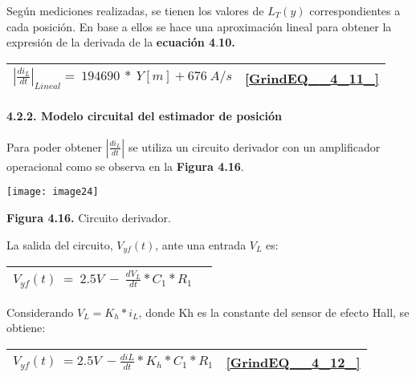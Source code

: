 \documentclass{article} %
\begin{document}
\noindent Seg\'{u}n mediciones realizadas, se tienen los valores de $L_T(y)$ correspondientes a cada posici\'{o}n. En base a ellos se hace una aproximaci\'{o}n lineal para obtener la expresi\'{o}n de la derivada de la \textbf{ecuaci\'{o}n 4}.\textbf{10.}

\noindent 

\begin{tabular}{|p{3.9in}|p{0.4in}|} \hline 
${\left|\frac{{di}_L}{dt}\right|}_{Lineal}=\ 194690\ *\ Y[m]+676\ A/s$ & \eqref{GrindEQ__4_11_}  \\ \hline 
\end{tabular}



\noindent 

\noindent \textbf{}

\noindent 
\paragraph{4.2.2. Modelo circuital del estimador de posici\'{o}n}

\noindent Para poder obtener $\left|\frac{{di}_L}{dt}\right|$ se utiliza un circuito derivador con un amplificador operacional como se observa en la \textbf{Figura 4.16}.

\noindent \texttt{[image: image24]}

\noindent \textbf{Figura 4.16.} Circuito derivador.

\noindent 

\noindent La salida del circuito, $V_{yf}(t)$, ante una entrada $V_L$ es:

\noindent 

\begin{tabular}{|p{3.9in}|p{0.4in}|} \hline 
$V_{yf}(t)\ =\ 2.5V\ -\ \frac{dV_L}{dt}*C_1*R_1$\textbf{} &   \\ \hline 
\end{tabular}



\noindent Considerando $V_L=K_h*i_L$, donde Kh es la constante del sensor de efecto Hall, se obtiene: 

\noindent 

\begin{tabular}{|p{3.9in}|p{0.4in}|} \hline 
$V_{yf}(t)\ =2.5V\ -\frac{diL}{dt}*K_h*C_1*R_1$\textbf{} & \eqref{GrindEQ__4_12_} \\ \hline 
\end{tabular}
\end{document}
